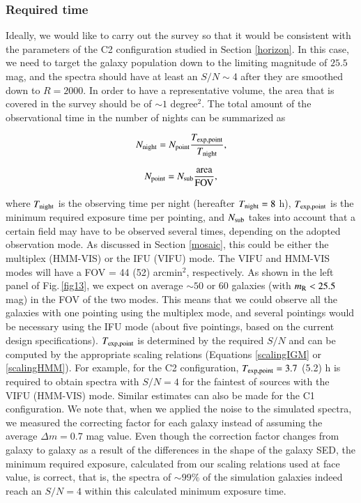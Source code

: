 \documentclass{aa}
\begin{document}
\subsubsection{Required time}
\label{reqtime}

Ideally, we would like to carry out the survey so that it would be consistent with the parameters of the C2 configuration studied in Section \ref{horizon}. In this case, we need to target the galaxy population down to the limiting magnitude of $25.5$ mag, and the spectra should have at least an $S/N\sim$4 after they are smoothed down to $R=2000$. In order to have a representative volume, the area that is covered in the survey should be of $\sim 1$ degree$^2$. The total amount of the observational time in the number of nights can be summarized as

\begin{equation}
\label{surveyEq}
N_{\rm night} = N_{\rm point} \frac{T_{\rm exp,point}}{T_{\rm night}},
\end{equation}

\begin{equation}
\label{nights}
N_{\rm point} = N_{\rm sub} \frac{{\rm area}}{{\rm FOV}},
\end{equation}

\noindent where $T_{\rm night}$ is the observing time per night (hereafter $T_{\rm night} = 8$ h), $T_{\rm exp,point}$ is the minimum required exposure time per pointing, and $N_{\rm sub}$ takes into account that a certain field may have to be observed several times, depending on the adopted observation mode. As discussed in Section \ref{mosaic}, this could be either the multiplex (HMM-VIS) or the IFU (VIFU) mode. The VIFU and HMM-VIS modes will have a FOV = 44 (52) arcmin$^2$, respectively. As shown in the left panel of Fig.\,\ref{fig13}, we expect on average $\sim50$ or 60 galaxies (with $m_{\rm R}< 25.5$ mag) in the FOV of the two modes. This means that we could observe all the galaxies with one pointing using the multiplex mode, and several pointings would be necessary using the IFU mode (about five pointings, based on the current design specifications). $T_{\rm exp,point}$ is determined by the required $S/N$ and can be computed by the appropriate scaling relations (Equations \ref{scalingIGM} or \ref{scalingHMM}). For example, for the C2 configuration, $T_{\rm exp,point} = 3.7$ (5.2) h is required to obtain spectra with $S/N = 4$ for the faintest of sources with the VIFU (HMM-VIS) mode. Similar estimates can also be made for the C1 configuration. We note that, when we applied the noise to the simulated spectra, we measured the correcting factor for each galaxy instead of assuming the average $\Delta m = 0.7$ mag value. Even though the correction factor changes from galaxy to galaxy as a result of the differences in the shape of the galaxy SED, the minimum required exposure, calculated from our scaling relations used at face value, is correct, that is, the spectra of $\sim99\%$ of the simulation galaxies indeed reach an $S/N=4$ within this calculated minimum exposure time.
\end{document}
